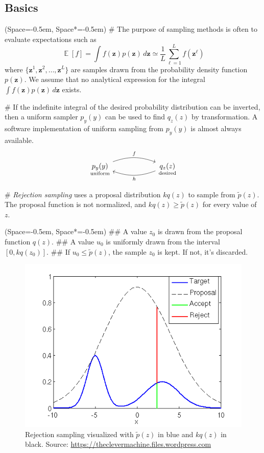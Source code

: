 \documentclass[12pt, a4paper]{article}
\newcommand{\listSpace}{-0.5em}%
\newcommand{\vect}[1]{\bm{#1}}
\DeclareMathOperator{\E}{\mathbb{E}}
\begin{document}
\subsection*{Basics}
\begin{easylist}[itemize]
	\ListProperties(Space=\listSpace, Space*=\listSpace)
	# The purpose of sampling methods is often to evaluate expectations such as
	\begin{equation*}
		\E \left[ f \right] =
		\int f(\vect{z}) p (\vect{z}) \, d \vect{z}
		\simeq 
		\frac{1}{L} \sum_{\ell = 1}^{L} f \left( \vect{z}^{\ell}\right)
	\end{equation*}
	where $\{ \vect{z}^{1}, \vect{z}^{2}, \ldots, \vect{z}^{L} \}$ are samples drawn from the probability density function $p(\vect{z})$.
	We assume that no analytical expression for the integral $\int f(\vect{z}) p (\vect{z}) \, d \vect{z}$ exists.
	
	# If the indefinite integral of the desired probability distribution can be inverted, then a uniform sampler $p_y(y)$ can be used to find $q_z(z)$
	by transformation.
	A software implementation of uniform sampling from $p_y(y)$ is almost always available.
	\[\begin{tikzcd}[column sep=6em]
	\underset{\text{uniform}}{p_y(y)} \arrow[bend left = 20]{r}{f} & \underset{\text{desired}}{q_z(z)} \arrow[ bend left = 20]{l}{h}
	\end{tikzcd}\]
	
	# \emph{Rejection sampling} uses a proposal distribution $kq(z)$ to sample from $\widetilde{p}(z)$.
	The proposal function is not normalized, and $kq(z) \geq \widetilde{p}(z)$ for every value of $z$.
	
	\begin{easylist}[enumerate]
		\ListProperties(Space=\listSpace, Space*=\listSpace)
	## A value $z_0$ is drawn from the proposal function $q(z)$.
	## A value $u_0$ is uniformly drawn from the interval $\left[0, kq(z_0)\right]$.
	## If $u_0 \leq \widetilde{p}(z)$, the sample $z_0$ is kept.
	   If not, it's discarded.
	\end{easylist}
	
	\begin{figure}[ht!]
		\centering
		\includegraphics[width=0.5\linewidth]{figs/rejection.png}
		\caption{Rejection sampling visualized with $\widetilde{p}(z)$ in blue and $kq(z)$ in black.
			Source: \url{https://theclevermachine.files.wordpress.com}}
		\label{fig:rejection}
	\end{figure}
	

\end{easylist}
\end{document}
